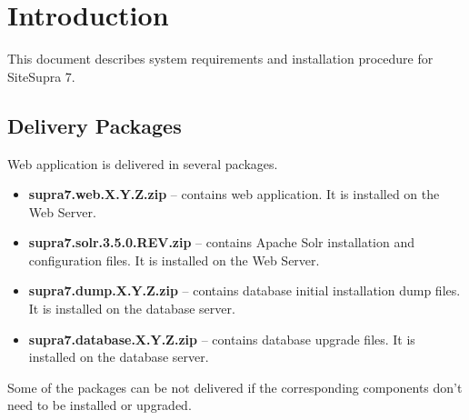 \documentclass[12pt]{article}
\newcommand{\vigProjectName}{SiteSupra 7}
\newcommand{\vigPackageSolr}{supra7.solr.3.5.0.REV.zip}
\newcommand{\vigPackageName}{supra7}
\newcommand{\vigReleaseVersion}{X.Y.Z}
\begin{document}
%
%
%

\newpage

\section{Introduction}

This document describes system requirements and installation procedure for {\vigProjectName}.

\subsection{Delivery Packages}

Web application is delivered in several packages.

\begin{itemize}
	\item \textbf{{\vigPackageName}.web.\vigReleaseVersion.zip} -- contains web application. It is installed on the Web Server.
	\item \textbf{\vigPackageSolr} -- contains Apache Solr installation and configuration files. It is installed on the Web Server.
	\item \textbf{{\vigPackageName}.dump.\vigReleaseVersion.zip} -- contains database initial installation dump files. It is installed on the database server.
	\item \textbf{{\vigPackageName}.database.\vigReleaseVersion.zip} -- contains database upgrade files. It is installed on the database server.
\end{itemize}

Some of the packages can be not delivered if the corresponding components don't need to be installed or upgraded.
\end{document}
